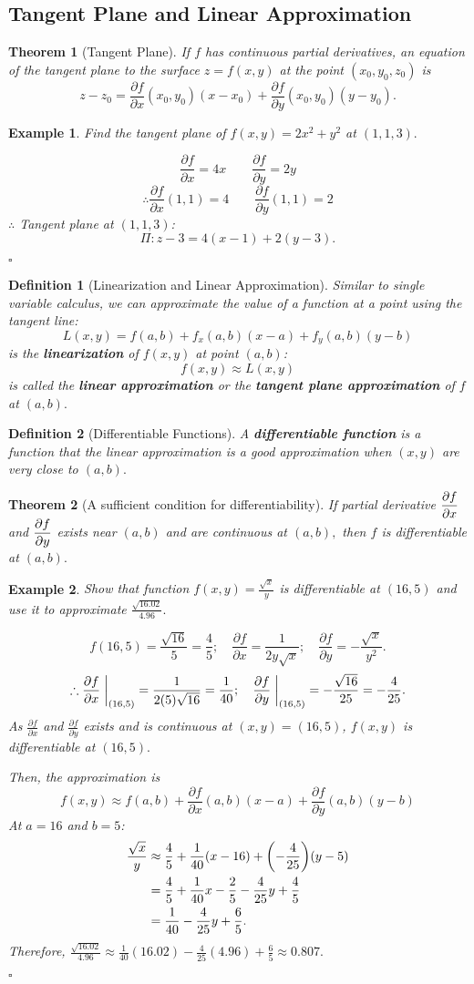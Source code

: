 \documentclass[12pt,a4paper]{article}
\newtheorem{thm}{Theorem}[subsection]
\newtheorem{df}{Definition}[subsection]
\newtheorem{eg}{Example}[subsection]
\newenvironment*{ans}{\par\indent{\textit{Answer. }}\par}{\par\hfill{$\square$}\par}
\def\del{\partial}
\def\pdfdx{\displaystyle\frac{\del f}{\del x}}
\def\pdfdy{\displaystyle\frac{\del f}{\del y}}
\begin{document}
\subsection{Tangent Plane and Linear Approximation}
\begin{thm}[Tangent Plane]
	If $f$ has continuous partial derivatives, an equation of the tangent plane to the surface $z=f(x,y)$ at the point $(x_0,y_0,z_0)$ is \[z-z_0=\pdfdx(x_0,y_0)(x-x_0)+\pdfdy(x_0,y_0)(y-y_0).\]	
\end{thm}
\begin{eg}
	Find the tangent plane of $f(x,y)=2x^2+y^2$ at $(1,1,3).$
	\begin{ans}
		\[\pdfdx=4x\qquad\pdfdy=2y\]
		\[\therefore \pdfdx(1,1)=4\qquad\pdfdy(1,1)=2\]
		$\therefore$ Tangent plane at $(1,1,3)$:\[\Pi: z-3=4(x-1)+2(y-3).\]
	\end{ans}
\end{eg}
\begin{df}[Linearization and Linear Approximation]
	Similar to single variable calculus, we can approximate the value of a function at a point using the tangent line: \[L(x,y)=f(a,b)+f_x(a,b)(x-a)+f_y(a,b)(y-b)\]	is the \textbf{linearization} of $f(x,y)$ at point $(a,b)$: \[f(x,y)\approx L(x,y)\] is called the \textbf{linear approximation} or the \textbf{tangent plane approximation} of $f$ at $(a,b).$
\end{df}
\begin{df}[Differentiable Functions]
	A \textbf{differentiable function} is a function that the linear approximation is a good approximation when $(x,y)$ are very close to $(a,b).$	
\end{df}
\begin{thm}[A sufficient condition for differentiability]
	If partial derivative $\displaystyle\pdfdx$ and $\displaystyle\pdfdy$ exists near $(a,b)$ and are continuous at $(a,b),$ then $f$ is differentiable at $(a,b).$
\end{thm}
\begin{eg}
	Show that function $\displaystyle f(x,y)=\frac{\sqrt{x}}{y}$ is differentiable at $(16,5)$ and use it to approximate $\displaystyle\frac{\sqrt{16.02}}{4.96}.$
	\begin{ans}
		\[f(16,5)=\frac{\sqrt{16}}{5}=\frac{4}{5};\quad\pdfdx=\frac{1}{2y\sqrt{x}};\quad\pdfdy=-\frac{\sqrt{x}}{y^2}.\]\[\therefore\pdfdx\eval{}_{(16,5)}=\frac{1}{2(5)\sqrt{16}}=\frac{1}{40};\quad\pdfdy\eval{}_{(16,5)}=-\frac{\sqrt{16}}{25}=-\frac{4}{25}.\]	As $\pdfdx$ and $\pdfdy$ exists and is continuous at $(x,y)=(16,5)$, $f(x,y)$ is differentiable at $(16,5).$\par Then, the approximation is \[f(x,y)\approx f(a,b)+\pdfdx(a,b)(x-a)+\pdfdy(a,b)(y-b)\] At $a=16$ and $b=5$: \[\begin{aligned}\frac{\sqrt{x}}{y}&\approx\frac{4}{5}+\frac{1}{40}(x-16)+\qty(-\frac{4}{25})(y-5)\\&=\frac{4}{5}+\frac{1}{40}x-\frac{2}{5}-\frac{4}{25}y+\frac{4}{5}\\&=\frac{1}{40}-\frac{4}{25}y+\frac{6}{5}.\end{aligned}\] Therefore, $\displaystyle\frac{\sqrt{16.02}}{4.96}\approx\frac{1}{40}(16.02)-\frac{4}{25}(4.96)+\frac{6}{5}\approx0.807.$
	\end{ans}
\end{eg}
\end{document}
